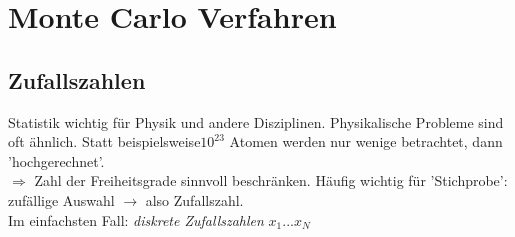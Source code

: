 \documentclass[12pt]{article}
\begin{document}
\section{Monte Carlo Verfahren}
\subsection{Zufallszahlen}
Statistik wichtig für Physik und andere Disziplinen. Physikalische Probleme sind oft ähnlich. Statt beispielsweise$10^{23}$ Atomen werden nur wenige betrachtet, dann 'hochgerechnet'.  \\
$\Rightarrow$ Zahl der Freiheitsgrade sinnvoll beschränken. Häufig wichtig für 'Stichprobe': zufällige Auswahl  $\to$ also Zufallszahl.\\
Im einfachsten Fall: \textit{diskrete Zufallszahlen} $x_1 ... x_N$\\
\end{document}
